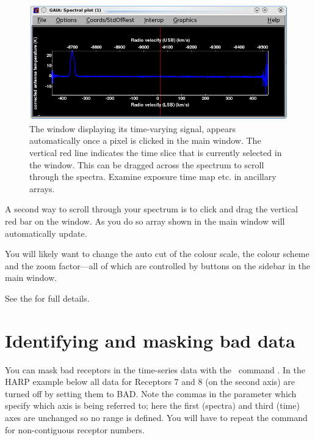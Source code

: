 \documentclass[11pt,oneside,chapters]{starlink}
\begin{document}
\begin{figure}[h!]
\begin{center}
\includegraphics[width=0.7\linewidth]{sc20_gaia2}
\caption[Spectral plot window with \gaia.]{\label{fig:gaia2}
  The  window displaying its time-varying
  signal, appears automatically once a pixel is clicked in the main window.
  The vertical red line indicates the time slice that is currently selected
  in the  window. This can be
  dragged across the spectrum to scroll through the spectra. Examine exposure
  time map etc. in ancillary arrays.}
\end{center}
\end{figure}



A second way to scroll through your spectrum is to click and drag the
vertical red bar on the  window. As you do so
array shown in the main window will automatically update.

You will likely want to change the auto cut of the colour scale, the
colour scheme and the zoom factor---all of which are controlled by
buttons on the sidebar in the main window.

See the  for full
details.

\section{Identifying and masking bad data}
\label{sec:badrecs}

You can mask bad receptors in the time-series data with the \Kappa\
command \chpix. In the HARP example below all data for Receptors 7 and 8
(on the second axis) are turned off by setting them to BAD. Note the
commas in the \param{SECTION} parameter which specify which axis is
being referred to; here the first (spectra) and third (time) axes are
unchanged so no range is defined. You will have to repeat the command
for non-contiguous receptor numbers.
\end{document}
